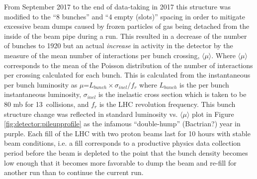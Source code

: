 From September 2017 to the end of data-taking in 2017 this structure was modified to the ``8 bunches'' and ``4 empty (slots)'' spacing in order to mitigate excessive beam dumps caused by frozen particles of gas being detached from the inside of the beam pipe during a run.
This resulted in a decrease of the number of bunches to 1920 but an actual \emph{increase} in activity in the detector by the measure of the mean number of interactions per bunch crossing, $\langle \mu \rangle$.  
Where $\langle \mu \rangle$ corresponds to the mean of the Poisson distribution of the number of interactions per crossing calculated for each bunch.
This is calculated from the instantaneous per bunch luminosity as $\mu$=$L_{bunch}\times \sigma_{inel} / f_{r}$ where $L_{bunch}$ is the per bunch instantaneous luminosity, $\sigma_{inel}$ is the inelastic cross section which is taken to be 80 mb for 13~\TeV collisions, and $f_{r}$ is the LHC revolution frequency.
This bunch structure change was reflected in standard luminosity vs. $\langle \mu \rangle$ plot in Figure \ref{fig:detector:pileupprofile} as the infamous ``double-hump'' (Bactrian?) year in purple.
Each fill of the LHC with two proton beams last for 10 hours with stable beam conditions, i.e. a fill corresponds to a  productive physics data collection period before the beam is depleted to the point that the bunch density becomes low enough that it becomes more favorable to dump the beam and re-fill for another run than to continue the current run.

